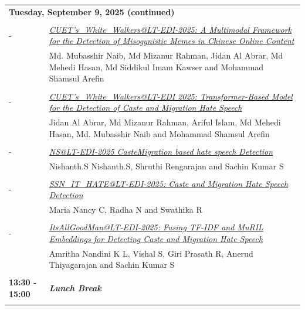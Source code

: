 \documentclass[11pt,oneside]{book}
\begin{document}
          \begin{tabular}{p{24mm}p{124mm}}
    \multicolumn{2}{l}{\bf Tuesday, September 9, 2025 (continued)} \\\\
          
                       -  & \hyperlink{page.68}{\emph{CUET's\_White\_Walkers@LT-EDI-2025: A Multimodal Framework for the Detection of Misogynistic Memes in Chinese Online Content}}\\
        & Md. Mubasshir Naib\index{Naib}, Md Mizanur Rahman\index{Rahman}, Jidan Al Abrar\index{Abrar}, Md Mehedi Hasan\index{Hasan}, Md Siddikul Imam Kawser\index{Kawser} and Mohammad Shamsul Arefin\index{Arefin}\\\\
                
                       -  & \hyperlink{page.75}{\emph{CUET's\_White\_Walkers@LT-EDI 2025: Transformer-Based Model for the Detection of Caste and Migration Hate Speech}}\\
        & Jidan Al Abrar\index{Abrar}, Md Mizanur Rahman\index{Rahman}, Ariful Islam\index{Islam}, Md Mehedi Hasan\index{Hasan}, Md. Mubasshir Naib\index{Naib} and Mohammad Shamsul Arefin\index{Arefin}\\\\
                
                       -  & \hyperlink{page.80}{\emph{NS@LT-EDI-2025 CasteMigration based hate speech Detection}}\\
        & Nishanth.S Nishanth.S\index{Nishanth.S}, Shruthi Rengarajan\index{Rengarajan} and Sachin Kumar S\index{S}\\\\
                
                       -  & \hyperlink{page.84}{\emph{SSN\_IT\_HATE@LT-EDI-2025: Caste and Migration Hate Speech Detection}}\\
        & Maria Nancy C\index{C}, Radha N\index{N} and Swathika R\index{R}\\\\
                
                       -  & \hyperlink{page.90}{\emph{ItsAllGoodMan@LT-EDI-2025: Fusing TF-IDF and MuRIL Embeddings for Detecting Caste and Migration Hate Speech}}\\
        & Amritha Nandini K L\index{L}, Vishal S\index{S}, Giri Prasath R\index{R}, Anerud Thiyagarajan\index{Thiyagarajan} and Sachin Kumar S\index{S}\\\\
                      \textbf{13:30 - 15:00} & \emph{\textbf{Lunch Break}}\\\\
      

\end{tabular}
\end{document}
